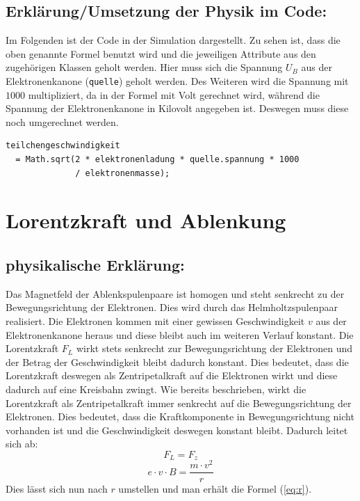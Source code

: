 \subsection{Erklärung/Umsetzung der Physik im Code:}

Im Folgenden ist der Code in der Simulation dargestellt.
Zu sehen ist, dass die oben genannte Formel benutzt wird und die jeweiligen Attribute aus den zugehörigen Klassen geholt werden.
Hier muss sich die Spannung $U_B$ aus der Elektronenkanone (\lstinline$quelle$)  geholt werden.
Des Weiteren wird die Spannung mit $1000$ multipliziert, da in der Formel mit Volt gerechnet wird, während die Spannung der Elektronenkanone in Kilovolt angegeben ist. Deswegen muss diese noch umgerechnet werden.

\begin{lstlisting}
teilchengeschwindigkeit 
  = Math.sqrt(2 * elektronenladung * quelle.spannung * 1000 
              / elektronenmasse);
\end{lstlisting}

\section{Lorentzkraft und Ablenkung}
\label{sec:a}
\subsection{physikalische Erklärung:}

Das Magnetfeld der Ablenkspulenpaare ist homogen und steht senkrecht zu der Bewegungsrichtung der Elektronen.
Dies wird durch das Helmholtzspulenpaar realisiert.
Die Elektronen kommen mit einer gewissen Geschwindigkeit $v$ aus der Elektronenkanone heraus und diese bleibt auch im weiteren Verlauf konstant.
Die Lorentzkraft $F_L$ wirkt stets senkrecht zur Bewegungsrichtung der Elektronen und der Betrag der Geschwindigkeit bleibt dadurch konstant.
Dies bedeutet, dass die Lorentzkraft deswegen als Zentripetalkraft auf die Elektronen wirkt und diese dadurch auf eine Kreisbahn zwingt.
Wie bereits beschrieben, wirkt die Lorentzkraft als Zentripetalkraft immer senkrecht auf die Bewegungsrichtung der Elektronen.
Dies bedeutet, dass die Kraftkomponente in Bewegungsrichtung nicht vorhanden ist und die Geschwindigkeit deswegen konstant bleibt.
Dadurch leitet sich ab: 
$$ F_L=F_z$$
$$ e \cdot v \cdot B = \frac{m \cdot v^2}{r}$$
Dies lässt sich nun nach $r$ umstellen und man erhält die Formel (\ref{eq:r}).   


